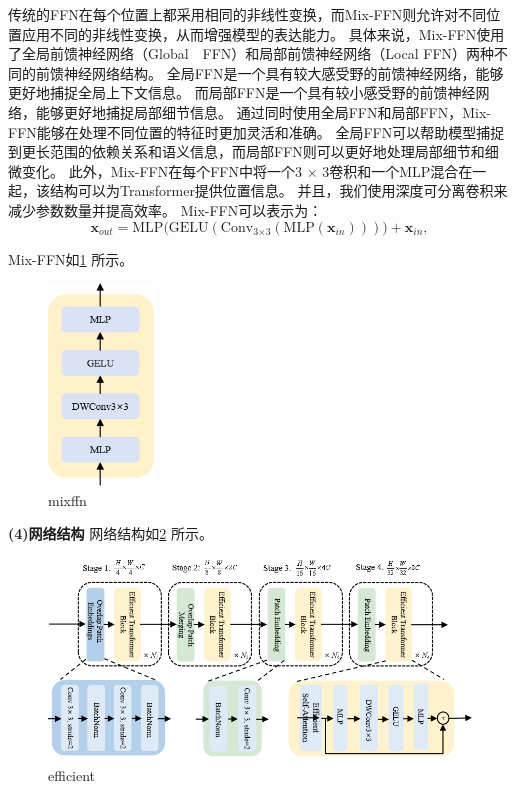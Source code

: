 传统的FFN在每个位置上都采用相同的非线性变换，而Mix-FFN则允许对不同位置应用不同的非线性变换，从而增强模型的表达能力。
具体来说，Mix-FFN使用了全局前馈神经网络（Global　FFN）和局部前馈神经网络（Local FFN）两种不同的前馈神经网络结构。
全局FFN是一个具有较大感受野的前馈神经网络，能够更好地捕捉全局上下文信息。
而局部FFN是一个具有较小感受野的前馈神经网络，能够更好地捕捉局部细节信息。 通过同时使用全局FFN和局部FFN，Mix-FFN能够在处理不同位置的特征时更加灵活和准确。
全局FFN可以帮助模型捕捉到更长范围的依赖关系和语义信息，而局部FFN则可以更好地处理局部细节和细微变化。
此外，Mix-FFN在每个FFN中将一个3 × 3卷积和一个MLP混合在一起，该结构可以为Transformer提供位置信息。
并且，我们使用深度可分离卷积来减少参数数量并提高效率。
Mix-FFN可以表示为：
\begin{equation}
	{\mathbf{x}_{out} = {\text{MLP(GELU}(\text{Conv}_{\text{3} \times \text{3}}(\text{MLP}(\mathbf{x}_{in}))))+ \mathbf{x}_{in}},}
	\label{eqn:mixffn}
\end{equation}

Mix-FFN如\ref{图：mixffn} 所示。
\begin{figure}[h]
	\centering
	\includegraphics[width=0.25\textwidth]{figures/mixffn.png}
	\caption{mixffn}
	\label{图：mixffn}
\end{figure}


\textbf{(4)网络结构}
网络结构如\ref{图：efficient} 所示。
\begin{figure}[h]
	\centering
	\includegraphics[width=\textwidth]{figures/efficient.png}
	\caption{efficient}
	\label{图：efficient}
\end{figure}





